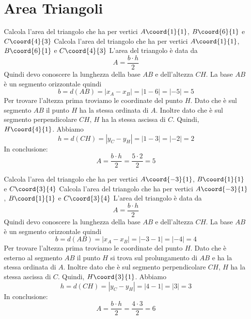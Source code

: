 \section{Area Triangoli}
\begin{exercise}
	Calcola l'area del triangolo che ha per vertici $A\coord{1}{1}$, $B\coord{6}{1}$ e $C\coord{4}{3}$
	\tcblower
	Calcola l'area del triangolo che ha per vertici $A\coord{1}{1}$, $B\coord{6}{1}$ 
	e $C\coord{4}{3}$
	L'area del triangolo è data da \[A=\dfrac{b\cdot h}{2}\]
	Quindi devo conoscere la lunghezza della base $AB$ e dell'altezza $CH$.
	La base $AB$ è un segmento orizzontale quindi \[b=d(AB)=\left| x_A-x_B\right|=\left| 1-6\right|=\left|-5\right|=5   \]
	Per trovare l'altezza prima troviamo le coordinate del punto $H$. Dato che è sul segmento $AB$ il punto $H$ ha la stessa ordinata di $A$. Inoltre dato che è sul segmento perpendicolare $CH$, $H$ ha la stessa ascissa di $C$. Quindi,  $H\coord{4}{1}$. Abbiamo \[h=d(CH)=\left| y_C-y_H\right|=\left| 1-3\right|=\left|-2\right|=2   \]In conclusione: \[A=\dfrac{b\cdot h}{2}=\dfrac{5\cdot 2}{2}=5\]
	\begin{center}
		
		\label{fig:AreaTriangolo1}
	\end{center}
\end{exercise}
\begin{exercise}
	Calcola l'area del triangolo che ha per vertici $A\coord{-3}{1}$, $B\coord{1}{1}$ e $C\coord{3}{4}$
	\tcblower
	Calcola l'area del triangolo che ha per vertici $A\coord{-3}{1}$, $B\coord{1}{1}$ e $C\coord{3}{4}$
	L'area del triangolo è data da \[A=\dfrac{b\cdot h}{2}\]
	Quindi devo conoscere la lunghezza della base $AB$ e dell'altezza $CH$.
	La base $AB$ è un segmento orizzontale quindi \[b=d(AB)=\left| x_A-x_B\right|=\left|-3-1\right|=\left|-4\right|=4   \]
	Per trovare l'altezza prima troviamo le coordinate del punto $H$. Dato che è esterno al segmento $AB$ il punto $H$ si trova sul prolungamento di $AB$ e ha la stessa ordinata di $A$. Inoltre dato che è sul segmento perpendicolare $CH$, $H$ ha la stessa ascissa di $C$. Quindi,  $H\coord{3}{1}$. Abbiamo \[h=d(CH)=\left| y_C-y_H\right|=\left| 4-1\right|=\left|3\right|=3   \]In conclusione: \[A=\dfrac{b\cdot h}{2}=\dfrac{4\cdot 3}{2}=6\]
	\begin{center}
		
		\label{fig:AreaTriangolo2}
	\end{center}
\end{exercise}
